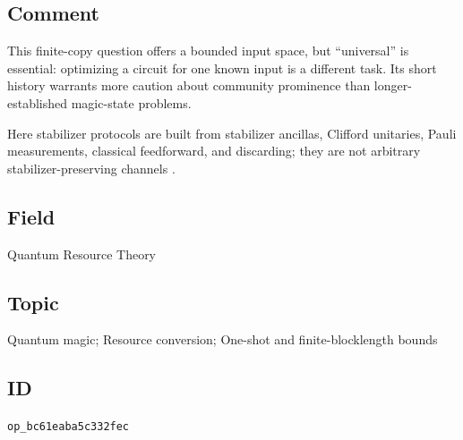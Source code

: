 \subsection*{Comment}

This finite-copy question offers a bounded input space, but “universal” is essential: optimizing a circuit for one known input is a different task. Its short history warrants more caution about community prominence than longer-established magic-state problems.

Here stabilizer protocols are built from stabilizer ancillas, Clifford unitaries, Pauli measurements, classical feedforward, and discarding; they are not arbitrary stabilizer-preserving channels .

\subsection*{Field}

Quantum Resource Theory

\subsection*{Topic}

Quantum magic; Resource conversion; One-shot and finite-blocklength bounds

\subsection*{ID}

\texttt{op\_bc61eaba5c332fec}
